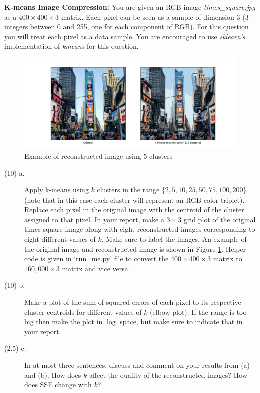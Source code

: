 \documentclass[11pt]{article}
\begin{document}
\begin{problem}{35}\textbf{K-means Image Compression:}
You are given an RGB image \textit{times\_square.jpg} as a $400 \times 400 \times 3$ matrix. Each pixel can be seen as a sample of dimension 3 (3 integers between 0 and 255, one for each component of RGB). For this question you will treat each pixel as a data sample. You are encouraged to use \textit{sklearn's} implementation of \textit{kmeans} for this question.

\begin{figure}[H]
  \centering
  \includegraphics[width=6in]{kmeans_example15.png}
  \caption{Example of reconstructed image using 5 clusters}
  \label{fig:kmeans}
\end{figure}

\begin{description}
\item [(10) a.]Apply k-means using $k$ clusters in the range $\{2, 5, 10, 25, 50, 75, 100, 200\}$ (note that in this case each cluster will represent an RGB color triplet). Replace each pixel in the original image with the centroid of the cluster assigned to that pixel. In your report, make a $3 \times 3$ grid plot of the original times square image along with eight reconstructed images corresponding to eight different values of $k$. Make sure to label the images. An example of the original image and reconstructed image is shown in Figure \ref{fig:kmeans}. Helper code is given in `run\_me.py' file to convert the $400 \times 400 \times 3$ matrix to $160,000 \times 3$ matrix and vice versa.

\item [(10) b.]Make a plot of the sum of squared errors of each pixel to its respective cluster centroids for different values of $k$ (elbow plot). If the range is too big then make the plot in $\log$ space, but make sure to indicate that in your report.

\item[(2.5) c.]In at most three sentences, discuss and comment on your results from (a) and (b).  How does $k$ affect the quality of the reconstructed images?  How does SSE change with $k$?


\end{description}
\end{problem}
\end{document}
